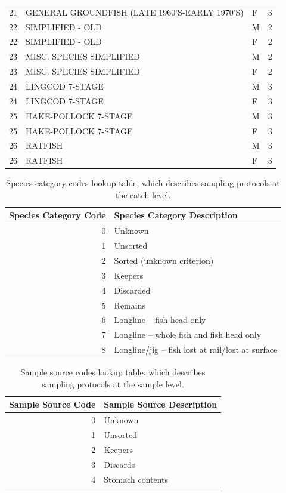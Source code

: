 \documentclass[11pt]{book}\usepackage[]{graphicx}\usepackage[]{color}
\begin{document}
\begin{table}[ht]
\begin{tabular}{rllr}
   21 & GENERAL GROUNDFISH (LATE 1960'S-EARLY 1970'S) & F &   3 \\ 
   22 & SIMPLIFIED - OLD & M &   2 \\ 
   22 & SIMPLIFIED - OLD & F &   2 \\ 
   23 & MISC. SPECIES SIMPLIFIED & M &   2 \\ 
   23 & MISC. SPECIES SIMPLIFIED & F &   2 \\ 
   24 & LINGCOD 7-STAGE & M &   3 \\ 
   24 & LINGCOD 7-STAGE & F &   3 \\ 
   25 & HAKE-POLLOCK 7-STAGE & M &   3 \\ 
   25 & HAKE-POLLOCK 7-STAGE & F &   3 \\ 
   26 & RATFISH & M &   3 \\ 
   26 & RATFISH & F &   3 \\ 
   \bottomrule
\end{tabular}
\end{table}


\begin{table}[ht]
\centering
\caption{Species category codes lookup table, which
  describes sampling protocols at the catch level.} 
\label{tab:spp-cat}
\begin{tabular}{rl}
  \toprule
Species Category Code & Species Category Description \\ 
  \midrule
  0 & Unknown \\ 
    1 & Unsorted \\ 
    2 & Sorted (unknown criterion) \\ 
    3 & Keepers \\ 
    4 & Discarded \\ 
    5 & Remains \\ 
    6 & Longline -- fish head only \\ 
    7 & Longline -- whole fish and fish head only \\ 
    8 & Longline/jig -- fish lost at rail/lost at surface \\ 
   \bottomrule
\end{tabular}
\end{table}


\begin{table}[ht]
\centering
\caption{Sample source codes lookup table, which
  describes sampling protocols at the sample level.} 
\label{tab:samp-source}
\begin{tabular}{rl}
  \toprule
Sample Source Code & Sample Source Description \\ 
  \midrule
  0 & Unknown \\ 
    1 & Unsorted \\ 
    2 & Keepers \\ 
    3 & Discards \\ 
    4 & Stomach contents \\ 
   \bottomrule
\end{tabular}
\end{table}
\end{document}
